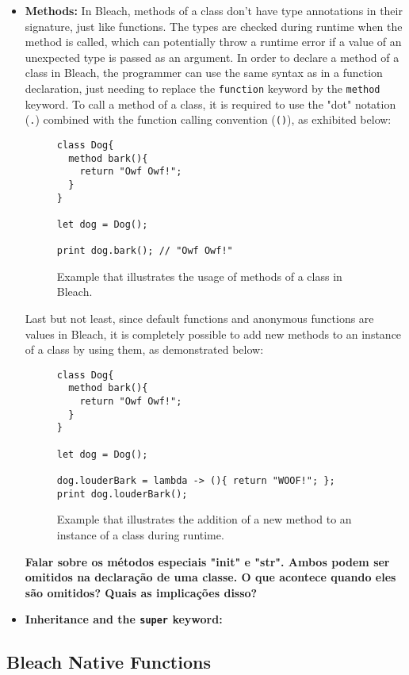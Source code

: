 \begin{itemize}
    \item \textbf{Methods:} In Bleach, methods of a class don't have type annotations in their signature, just like functions. The types are checked during runtime when the method is called, which can potentially throw a runtime error if a value of an unexpected type is passed as an argument. In order to declare a method of a class in Bleach, the programmer can use the same syntax as in a function declaration, just needing to replace the \texttt{function} keyword by the \texttt{method} keyword. To call a method of a class, it is required to use the "dot" notation (\texttt{.}) combined with the function calling convention (\texttt{()}), as exhibited below:
\begin{figure}[H]
    \centering
    \begin{lstlisting}
class Dog{
  method bark(){
    return "Owf Owf!";
  }
}

let dog = Dog();

print dog.bark(); // "Owf Owf!"
    \end{lstlisting}
    \caption{Example that illustrates the usage of methods of a class in Bleach.}
\end{figure}

    Last but not least, since default functions and anonymous functions are values in Bleach, it is completely possible to add new methods to an instance of a class by using them, as demonstrated below:
\begin{figure}[H]
    \centering
    \begin{lstlisting}
class Dog{
  method bark(){
    return "Owf Owf!";
  }
}

let dog = Dog();

dog.louderBark = lambda -> (){ return "WOOF!"; };
print dog.louderBark();
    \end{lstlisting}
    \caption{Example that illustrates the addition of a new method to an instance of a class during runtime.}
\end{figure}
    
    \textbf{Falar sobre os métodos especiais "init" e "str". Ambos podem ser omitidos na declaração de uma classe. O que acontece quando eles são omitidos? Quais as implicações disso?}

    
    \item \textbf{Inheritance and the \texttt{super} keyword:}
\end{itemize}


\subsection{Bleach Native Functions}

